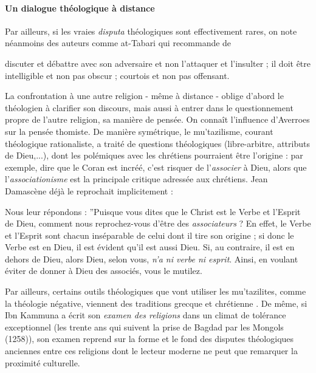 \paragraph{Un dialogue théologique à distance} Par ailleurs, si les vraies \textit{disputa} théologiques sont effectivement rares, on note néanmoins des auteurs comme at-Tabari qui recommande de
\begin{singlequote}
    {discuter et débattre avec son adversaire et non l’attaquer et l’insulter ; il doit être intelligible et non pas obscur ; courtois et non pas offensant.\cite[p. 34-36 cité dans le cours ]{tabari_refutation_1979}}
\end{singlequote}
La confrontation à une autre religion - même à distance - oblige d'abord le théologien à clarifier  son discours, mais aussi à entrer dans le questionnement propre de l'autre religion, sa manière de pensée. On connaît l'influence d'Averroes sur la pensée thomiste. De manière symétrique, le  mu'tazilisme, courant théologique rationaliste, a traité de questions théologiques (libre-arbitre,  attributs de Dieu,...), dont les polémiques avec les chrétiens pourraient être l'origine : par exemple,  dire que le Coran est incréé, c'est risquer de l'\textit{associer} à Dieu, alors que l'\textit{associationisme} est la principale critique adressée aux chrétiens. Jean Damascène déjà le reprochait implicitement : 
\begin{singlequote}
   Nous leur répondons : ”Puisque vous dites que le Christ est le
Verbe et l’Esprit de Dieu, comment nous reprochez-vous d’être des \textit{associateurs}
? En effet, le Verbe et l’Esprit sont chacun inséparable de celui dont il
tire son origine ; si donc le Verbe est en Dieu, il est évident qu’il est aussi
Dieu. Si, au contraire, il est en dehors de Dieu, alors Dieu, selon vous, \textit{n’a ni
verbe ni esprit}. Ainsi, en voulant éviter de donner à Dieu des associés, vous
le mutilez.\cite[p.216]{damascene_ecrits_1992}
\end{singlequote}

Par ailleurs, certains outils théologiques que vont utiliser les mu'tazilites, comme la théologie négative, viennent des
traditions grecque et chrétienne \cite{Candiard_theologie_2022}. De même, si Ibn Kammuna \cite{ibn_kammuna_examen_2012} a écrit son\textit{ examen des religions} dans un climat de tolérance exceptionnel (les trente ans qui suivent la prise de Bagdad par les Mongols (1258)), son examen reprend sur la forme et le fond des disputes théologiques anciennes entre ces religions dont le lecteur moderne ne peut que remarquer la proximité culturelle. 


